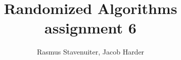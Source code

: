 

\title{Randomized Algorithms assignment 6}
\author{Rasmus Stavenuiter, Jacob Harder}


\maketitle









